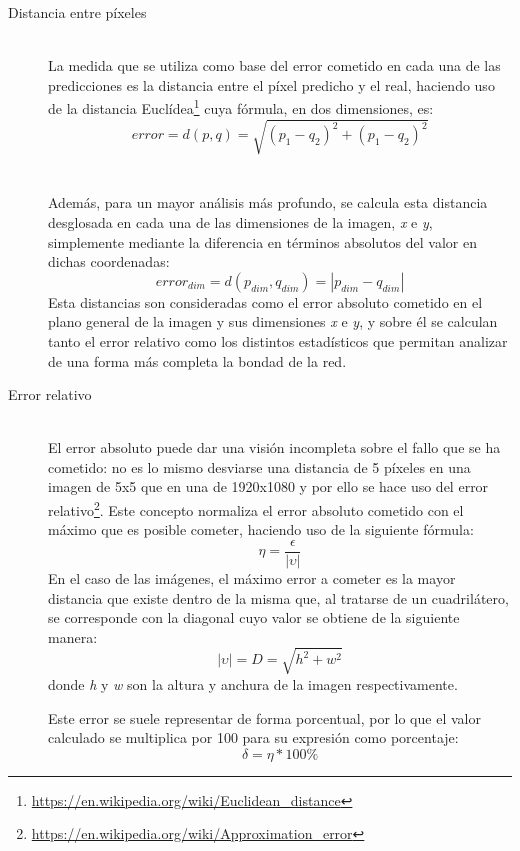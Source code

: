 \begin{description}
\item[Distancia entre píxeles] \hfill 
\vspace{10pt}
\\
La medida que se utiliza como base del error cometido en cada una de las predicciones es la distancia entre el píxel predicho y el real, haciendo uso de la distancia Euclídea\footnote{\url{https://en.wikipedia.org/wiki/Euclidean_distance}} cuya fórmula, en dos dimensiones, es:  
$$error = d(p,q) = \sqrt{(p_1 - q_2)^2 + (p_1 - q_2)^2}$$\\
\vspace{10pt}
\\
Además, para un mayor análisis más profundo, se calcula esta distancia desglosada en cada una de las dimensiones de la imagen, \textit{x} e \textit{y}, simplemente mediante la diferencia en términos absolutos del valor en dichas coordenadas:
$$error_{dim} = d(p_{dim}, q_{dim}) = |p_{dim} - q_{dim}|$$
Esta distancias son consideradas como el error absoluto cometido en el plano general de la imagen y sus dimensiones \textit{x} e \textit{y}, y sobre él se calculan tanto el error relativo como los distintos estadísticos que permitan analizar de una forma más completa la bondad de la red.

\vspace{10pt}

\item[Error relativo] \hfill 
\vspace{10pt}
\\
El error absoluto puede dar una visión incompleta sobre el fallo que se ha cometido: no es lo mismo desviarse una distancia de 5 píxeles en una imagen de 5x5 que en una de 1920x1080 y por ello se hace uso del error relativo\footnote{\url{https://en.wikipedia.org/wiki/Approximation_error}}. Este concepto normaliza el error absoluto cometido con el máximo que es posible cometer, haciendo uso de la siguiente fórmula:
$$\eta = \frac{\epsilon}{|\upsilon|}$$
En el caso de las imágenes, el máximo error a cometer es la mayor distancia que existe dentro de la misma que, al tratarse de un cuadrilátero, se corresponde con la diagonal cuyo valor se obtiene de la siguiente manera:
$$|\upsilon| = D = \sqrt{h^2 + w^2}$$
donde \textit{h} y \textit{w} son la altura y anchura de la imagen respectivamente.

Este error se suele representar de forma porcentual, por lo que el valor calculado se multiplica por 100 para su expresión como porcentaje:
$$\delta = \eta * 100\%$$


\end{description}
